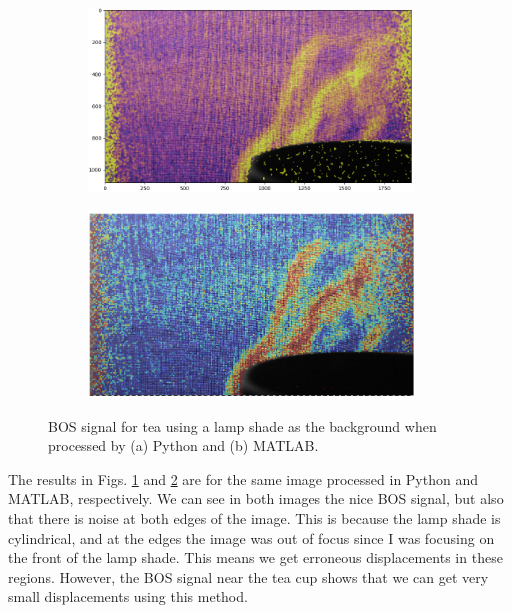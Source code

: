 \documentclass[letterpaper,12pt]{article}
\begin{document}
\begin{figure}[h]
    \centering
    \begin{subfigure}[b]{0.45\textwidth}
    	\centering
        \includegraphics[width=0.95\textwidth]{Python_Tea.PNG}
        \caption{}
        \label{fig:Python_Tea}
    \end{subfigure}
    \begin{subfigure}[b]{0.45\textwidth}
    	\centering
        \includegraphics[width=0.95\textwidth]{MATLAB_Tea.PNG}
        \caption{}
        \label{fig:MATLAB_Tea}
    \end{subfigure}

    \caption{BOS signal for tea using a lamp shade as the background when processed by (a) Python and (b) MATLAB.}
    \label{fig:Tea}
\end{figure}

The results in Figs. \ref{fig:Python_Tea} and \ref{fig:MATLAB_Tea} are for the same image processed in Python and MATLAB, respectively.  We can see in both images the nice BOS signal, but also that there is noise at both edges of the image.  This is because the lamp shade is cylindrical, and at the edges the image was out of focus since I was focusing on the front of the lamp shade.  This means we get erroneous displacements in these regions.  However, the BOS signal near the tea cup shows that we can get very small displacements using this method.
\end{document}
